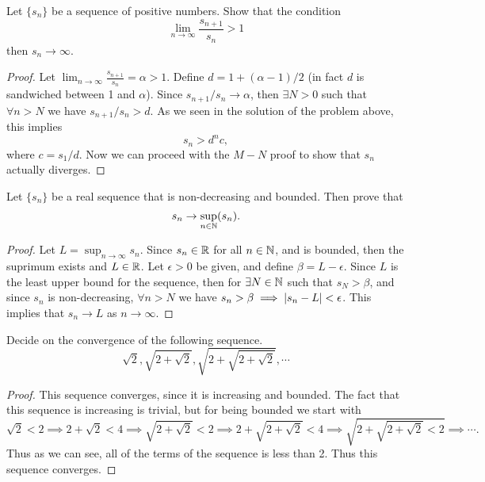 \begin{problem}
	Let $\{s_n\}$ be a sequence of positive numbers. Show that the condition
	\[ \lim_{n\to\infty} \frac{s_{n+1}}{s_n} > 1 \]
	then $s_n \to \infty$.
\end{problem}

\begin{proof}
	Let $\lim_{n\to\infty} \frac{s_{n+1}}{s_n} = \alpha > 1$. Define $d = 1 + (\alpha - 1)/2$ (in fact $d$ is sandwiched between 1 and $\alpha$). Since $s_{n+1}/s_n \to \alpha$, then $\exists N>0$ such that $\forall n>N$ we have $s_{n+1}/s_n > d$. As we seen in the solution of the problem above, this implies 
	\[ s_n > d^n c, \]
	where $c = s_1/d$. Now we can proceed with the $M-N$ proof to show that $s_n$ actually diverges.
\end{proof}

\begin{problem}
	Let $\{s_n\}$ be a real sequence that is non-decreasing and bounded. Then prove that 
	\[ s_n \to \sup_{n\in\mathbb{N}}(s_n). \]
\end{problem}
\begin{proof}
	Let $L = \sup_{n\to \infty} s_n$. Since $s_n \in \mathbb{R}$ for all $n \in \mathbb{N}$, and is bounded, then the suprimum exists and $L \in \mathbb{R}$. Let $\epsilon>0$ be given, and define $\beta = L - \epsilon$. Since $L$ is the least upper bound for the sequence, then for $\exists N \in \mathbb{N}$ such that $s_N > \beta$, and since $s_n$ is non-decreasing, $\forall n>N$ we have $s_n > \beta \implies |s_n - L| < \epsilon$. This implies that $s_n \to L$ as $n\to\infty$.
\end{proof}

\begin{problem}
	Decide on the convergence of the following sequence.
	\[ \sqrt{2}, \sqrt{2+\sqrt{2}}, \sqrt{2+\sqrt{2+\sqrt{2}}}, \cdots \]
\end{problem}

\begin{proof}
	This sequence converges, since it is increasing and bounded. The fact that this sequence is increasing is trivial, but for being bounded we start with
	\[ \boxed{\sqrt{2}< 2}  \implies 2+\sqrt{2} < 4 \implies \boxed{\sqrt{2+\sqrt{2}} < 2} \implies 2+\sqrt{2+\sqrt{2}}<4 \implies \boxed{\sqrt{2+\sqrt{2+\sqrt{2}}<2}} \implies \cdots. \]
	Thus as we can see, all of the terms of the sequence is less than 2. Thus this sequence converges.
\end{proof}